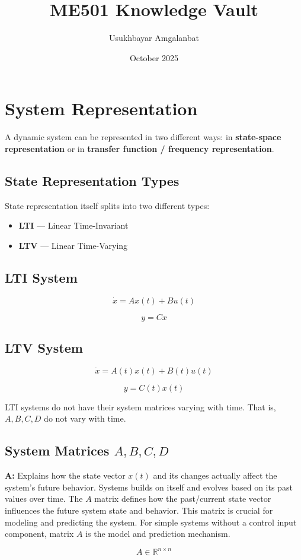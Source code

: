 \documentclass{article}
\title{ME501 Knowledge Vault}
\author{Usukhbayar Amgalanbat}
\date{October 2025}
\begin{document}
\section*{System Representation}

A dynamic system can be represented in two different ways:  
in \textbf{state-space representation} or in \textbf{transfer function / frequency representation}.

\subsection*{State Representation Types}

State representation itself splits into two different types:

\begin{itemize}
    \item \textbf{LTI} — Linear Time-Invariant
    \item \textbf{LTV} — Linear Time-Varying
\end{itemize}

\subsection*{LTI System}

\begin{equation}
    \dot{x} = A x(t) + B u(t)
\end{equation}

\begin{equation}
    y = Cx
\end{equation}

\subsection*{LTV System}

\begin{equation}
    \dot{x} = A(t)x(t) + B(t)u(t)
\end{equation}

\begin{equation}
    y = C(t)x(t)
\end{equation}

LTI systems do not have their system matrices varying with time.  
That is, \(A, B, C, D\) do not vary with time.

\subsection*{System Matrices \(A, B, C, D\)}

\textbf{A:} Explains how the state vector \(x(t)\) and its changes actually affect the system's future behavior.  
Systems builds on itself and evolves based on its past values over time.  
The \(A\) matrix defines how the past/current state vector influences the future system state and behavior.  
This matrix is crucial for modeling and predicting the system.  
For simple systems without a control input component, matrix \(A\) is the model and prediction mechanism.

\[
A \in \mathbb{R}^{n \times n}
\]
\end{document}
